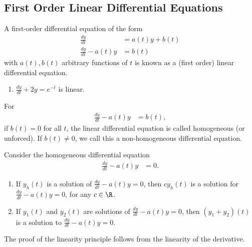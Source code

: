 \documentclass[10pt]{mypackage}
\begin{document}
\subsection{First Order Linear Differential Equations}%
\begin{definition}
  A first-order differential equation of the form 
  \begin{align*}
    \frac{dy}{dt} &= a(t) y + b(t)\\
    \frac{dy}{dt} - a(t) y &= b(t)
  \end{align*}
  with $a(t),b(t)$ arbitrary functions of $t$ is known as a (first order) linear differential equation.
\end{definition}
\begin{example}\hfill
  \begin{enumerate}[(1)]
    \item $\frac{dy}{dt} +2y = e^{-t}$ is linear.
  \end{enumerate}
\end{example}
\begin{definition}
  For
  \begin{align*}
    \frac{dy}{dt} - a(t) y &= b(t),
  \end{align*}
  if $b(t) = 0$ for all $t$, the linear differential equation is called homogeneous (or unforced). If $b(t)\neq 0$, we call this a non-homogeneous differential equation.
\end{definition}
\begin{definition}
  Consider the homogeneous differential equation
  \begin{align*}
    \frac{dy}{dt} - a(t) y &= 0.
  \end{align*}
  \begin{enumerate}[(1)]
    \item If $y_h(t) $ is a solution of $ \frac{dy}{dt} - a(t) y = 0$, then $cy_h(t)$ is a solution for $\frac{dy}{dt} - a(t) y = 0$, for any $c\in \R$.
    \item If $y_1(t)$ and $y_2(t)$ are solutions of $\frac{dy}{dt} - a(t) y = 0$, then $\left(y_1 + y_2\right)(t)$ is a solution to $\frac{dy}{dt} - a(t) y = 0$.
  \end{enumerate}
\end{definition}
The proof of the linearity principle follows from the linearity of the derivative.
\end{document}
